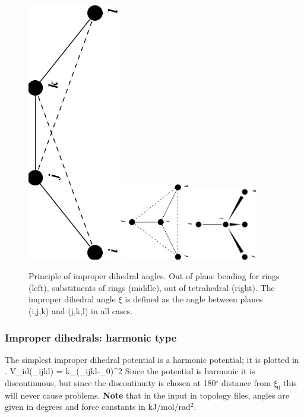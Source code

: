 \begin {figure}
\centerline{\includegraphics[angle=270,width=4cm]{plots/ring-imp}\hspace{1cm}
\includegraphics[angle=270,width=3cm]{plots/subst-im}\hspace{1cm}\includegraphics[angle=270,width=3cm]{plots/tetra-im}}
\caption[Improper dihedral angles.]{Principle of improper
dihedral angles. Out of plane bending for rings (left), substituents
of rings (middle), out of tetrahedral (right). The improper dihedral
angle $\xi$ is defined as the angle between planes (i,j,k) and (j,k,l)
in all cases.}
\label{fig:imp}
\end {figure}

\subsubsection{Improper dihedrals: harmonic type}
\label{subsec:harmonicimproperdihedral}
The simplest improper dihedral potential is a harmonic potential; it is plotted in
.
\beq
V_{id}(\xi_{ijkl}) = \half k_{\xi}(\xi_{ijkl}-\xi_0)^2
\eeq
Since the potential is harmonic it is discontinuous,
but since the discontinuity is chosen at 180$^\circ$ distance from $\xi_0$
this will never cause problems.
{\bf Note} that in the input in topology files, angles are given in degrees and
force constants in kJ/mol/rad$^2$.

